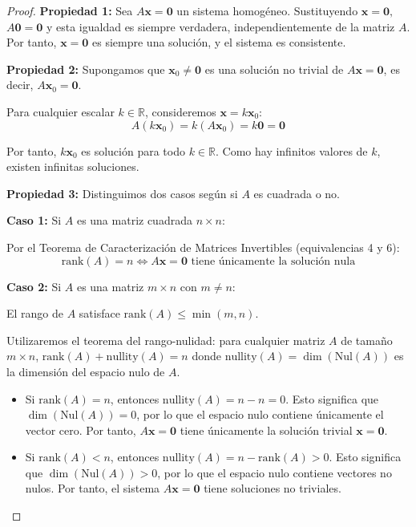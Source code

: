 \begin{proof} 

\textbf{Propiedad 1:} Sea $A\mathbf{x} = \mathbf{0}$ un sistema homogéneo. Sustituyendo $\mathbf{x} = \mathbf{0},$ $A\mathbf{0} = \mathbf{0}$ y esta igualdad es siempre verdadera, independientemente de la matriz $A$. Por tanto, $\mathbf{x} = \mathbf{0}$ es siempre una solución, y el sistema es consistente.


\textbf{Propiedad 2:} Supongamos que $\mathbf{x}_0 \neq \mathbf{0}$ es una solución no trivial de $A\mathbf{x} = \mathbf{0}$, es decir, $A\mathbf{x}_0 = \mathbf{0}$.

Para cualquier escalar $k \in \mathbb{R}$, consideremos $\mathbf{x} = k\mathbf{x}_0$:
$$A(k\mathbf{x}_0) = k(A\mathbf{x}_0) = k\mathbf{0} = \mathbf{0}$$

Por tanto, $k\mathbf{x}_0$ es solución para todo $k \in \mathbb{R}$. Como hay infinitos valores de $k$, existen infinitas soluciones.

\textbf{Propiedad 3:} Distinguimos dos casos según si $A$ es cuadrada o no.

\textbf{Caso 1:} Si $A$ es una matriz cuadrada $n \times n$:

Por el Teorema de Caracterización de Matrices Invertibles (equivalencias 4 y 6):
$$\text{rank}(A) = n \iff A\mathbf{x} = \mathbf{0} \text{ tiene únicamente la solución nula}$$

\textbf{Caso 2:} Si $A$ es una matriz $m \times n$ con $m \neq n$:

El rango de $A$ satisface $\text{rank}(A) \leq \min(m,n)$.

Utilizaremos el teorema del rango-nulidad: para cualquier matriz $A$ de tamaño $m \times n$,
$\text{rank}(A) + \text{nullity}(A) = n$
donde $\text{nullity}(A) = \dim(\text{Nul}(A))$ es la dimensión del espacio nulo de $A$.

\begin{itemize}
\item Si $\text{rank}(A) = n$, entonces $\text{nullity}(A) = n - n = 0$. Esto significa que $\dim(\text{Nul}(A)) = 0$, por lo que el espacio nulo contiene únicamente el vector cero. Por tanto, $A\mathbf{x} = \mathbf{0}$ tiene únicamente la solución trivial $\mathbf{x} = \mathbf{0}$.

\item Si $\text{rank}(A) < n$, entonces $\text{nullity}(A) = n - \text{rank}(A) > 0$. Esto significa que $\dim(\text{Nul}(A)) > 0$, por lo que el espacio nulo contiene vectores no nulos. Por tanto, el sistema $A\mathbf{x} = \mathbf{0}$ tiene soluciones no triviales.
\end{itemize}



\end{proof}
